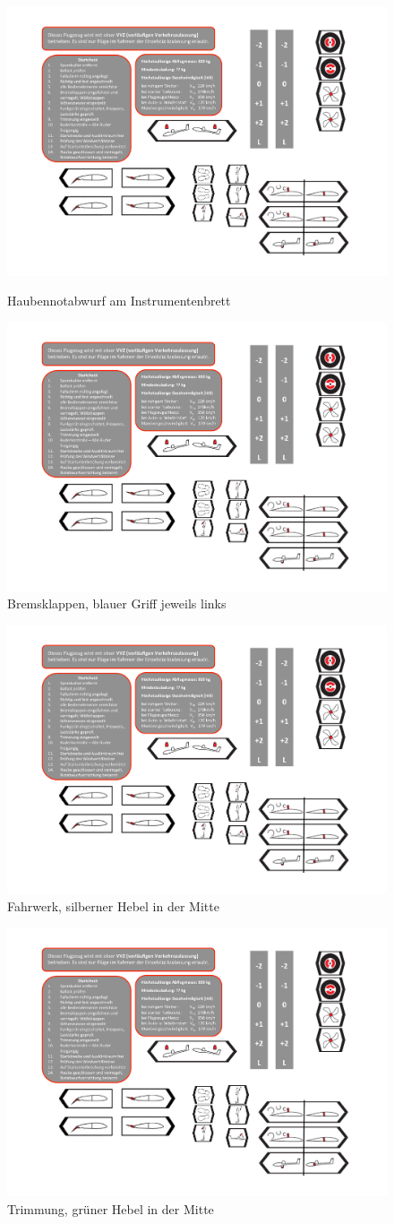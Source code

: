 \begin{figure}[h]
\begin{center}
\includegraphics[width=.15\textwidth]{bilder/notabwurf.pdf}\\
\caption*{Haubennotabwurf am Instrumentenbrett}
\end{center}
\end{figure}

\begin{figure}[h]
\begin{center}
\includegraphics[width=.45\textwidth]{bilder/bk.pdf}
\caption*{Bremsklappen, blauer Griff jeweils links}
\end{center}
\end{figure}


\begin{figure}[h]
\begin{center}
\includegraphics[width=.45\textwidth]{bilder/fahrwerk.pdf}
\caption*{Fahrwerk, silberner Hebel in der Mitte}
\end{center}
\end{figure}

\begin{figure}[h]
\begin{center}
\includegraphics[width=.45\textwidth]{bilder/trimmung.pdf}
\caption*{Trimmung, grüner Hebel in der Mitte}
\end{center}
\end{figure}

